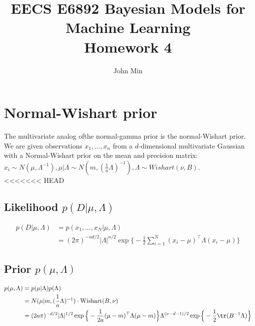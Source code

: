 \documentclass{article}
\author{John Min}
\title{EECS E6892 Bayesian Models for Machine Learning \\ Homework 4}
\begin{document}
\maketitle

\newpage
\section{Normal-Wishart prior}

\noindent
The multivariate analog ofthe normal-gamma prior is the normal-Wishart prior. \\

\noindent
We are given observations $x_1, \ldots, x_n$ from a $d$-dimensional multivariate Gaussian with a Normal-Wishart prior on the mean and precision matrix:  $x_i \sim N(\mu, \Lambda^{-1}), \mu | \Lambda \sim N(m, (\frac{1}{a} \Lambda)^{-1}), \Lambda \sim Wishart(\nu, B).$  \\

<<<<<<< HEAD
\subsection{Likelihood $p(D | \mu, \Lambda)$}
\begin{align*}
p(D | \mu, \Lambda) &= p(x_1, \ldots, x_N | \mu, \Lambda) \\
					&= (2\pi)^{-nd/2} |\Lambda|^{n/2} \exp\Big\{ -\frac{1}{2} \displaystyle \sum_{i=1}^N (x_i - \mu)^\top \Lambda (x_i - \mu) \Big\}
\end{align*}

\subsection{Prior $p(\mu, \Lambda)$}
\begin{align*}
p(\mu, \Lambda) &= p(\mu | \Lambda) p(\Lambda) \\
				&= N(\mu | m, (\frac{1}{a}\Lambda)^{-1}) \cdot \text{Wishart}(B,\nu) \\
				&= (2a \pi)^{-d/2} \vert \Lambda \vert^{1/2} \exp \Big\{-\frac{1}{2a} (\mu-m)^\top \Lambda (\mu-m) \Big\} \Lambda^{(\nu-d-1)/2} \exp \Big\{-\frac{1}{2} \tr(B^{-1}\Lambda) \Big \}
\end{align*}
\end{document}
